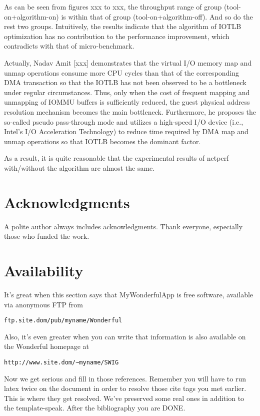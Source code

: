 \documentclass[letterpaper,twocolumn,10pt]{article}
\begin{document}
As can be seen from figures xxx to xxx, the throughput range of group (tool-on+algorithm-on) is within that of group (tool-on+algorithm-off). And so do the rest two groups. Intuitively, the results indicate that the algorithm of IOTLB optimization has no contribution to the performance improvement, which contradicts with that of micro-benchmark.

Actually, Nadav Amit [xxx] demonstrates that the virtual I/O memory map and unmap operations consume more CPU cycles than  that of the corresponding DMA transaction so that the IOTLB has not been observed to be a bottleneck under regular circumstances. Thus, only when the cost of frequent mapping and unmapping of IOMMU buffers is sufficiently reduced, the guest physical address resolution mechanism becomes the main bottleneck. Furthermore, he proposes the so-called pseudo pass-through mode and utilizes a high-speed I/O device (i.e., Intel’s I/O Acceleration Technology) to reduce time required by DMA map and unmap operations so that IOTLB becomes the dominant factor. 

As a result, it is quite reasonable that the experimental results of netperf with/without the algorithm are almost the same. 



\section{Acknowledgments}

A polite author always includes acknowledgments.  Thank everyone,
especially those who funded the work.

\section{Availability}

It's great when this section says that MyWonderfulApp is free software,
available via anonymous FTP from

\begin{center}
{\tt ftp.site.dom/pub/myname/Wonderful}\\
\end{center}

Also, it's even greater when you can write that information is also
available on the Wonderful homepage at

\begin{center}
{\tt http://www.site.dom/\~{}myname/SWIG}
\end{center}

Now we get serious and fill in those references.  Remember you will
have to run latex twice on the document in order to resolve those
cite tags you met earlier.  This is where they get resolved.
We've preserved some real ones in addition to the template-speak.
After the bibliography you are DONE.

{\footnotesize 
}


\theendnotes
\end{document}
